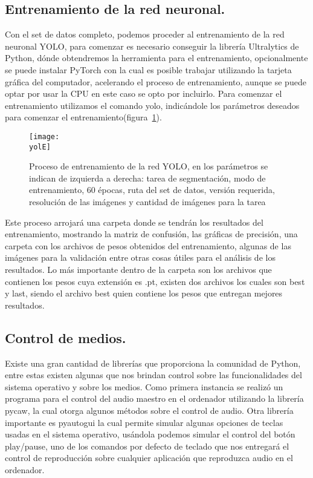 \documentclass[a4paper, 12pt]{article}
\newcommand{\yolE}{img/yolo_comand.png}
\begin{document}
	\subsection{Entrenamiento de la red neuronal.}
	Con el set de datos completo, podemos proceder al entrenamiento de la red neuronal YOLO, para comenzar es necesario conseguir la librería Ultralytics de Python, dónde obtendremos la herramienta para el entrenamiento, opcionalmente se puede instalar PyTorch con la cual es posible trabajar utilizando la tarjeta gráfica del computador, acelerando el proceso de entrenamiento, aunque se puede optar por usar la CPU en este caso se opto por incluirlo. Para comenzar el entrenamiento utilizamos el comando yolo, indicándole los parámetros deseados para comenzar el entrenamiento(figura~\ref{fig:yolo_train}).
	
	\begin{figure}[H]
		\centering
		\texttt{[image: \\yolE]}
		\caption{Proceso de entrenamiento de la red YOLO, en los parámetros se indican de izquierda a derecha: tarea de segmentación, modo de entrenamiento, 60 épocas, ruta del set de datos, versión requerida, resolución de las imágenes y cantidad de imágenes para la tarea}
		\label{fig:yolo_train}
	\end{figure}

	Este proceso arrojará una carpeta donde se tendrán los resultados del entrenamiento, mostrando la matriz de confusión, las gráficas de precisión, una carpeta con los archivos de pesos obtenidos del entrenamiento, algunas de las imágenes para la validación entre otras cosas útiles para el análisis de los resultados. Lo más importante dentro de la carpeta son los archivos que contienen los pesos cuya extensión es .pt, existen dos archivos los cuales son best y last, siendo el archivo best quien contiene los pesos que entregan mejores resultados. 

	\subsection{Control de medios.}
	Existe una gran cantidad de librerías que proporciona la comunidad de Python, entre estas existen algunas que nos brindan control sobre las funcionalidades del sistema operativo y sobre los medios. Como primera instancia se realizó un programa para el control del audio maestro en el ordenador utilizando la librería pycaw, la cual otorga algunos métodos sobre el control de audio. Otra librería importante es pyautogui la cual permite simular algunas opciones de teclas usadas en el sistema operativo, usándola podemos simular el control del botón play/pause, uno de los comandos por defecto de teclado que nos entregará el control de reproducción sobre cualquier aplicación que reproduzca audio en el ordenador.
    \clearpage
\end{document}
